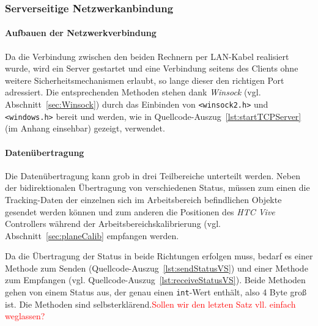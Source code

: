 \subsubsection{Serverseitige Netzwerkanbindung}\label{sec:serverClient}
\paragraph{Aufbauen der Netzwerkverbindung}
Da die Verbindung zwischen den beiden Rechnern per LAN-Kabel realisiert wurde, wird ein Server gestartet und eine Verbindung seitens des Clients ohne weitere Sicherheitsmechanismen erlaubt, so lange dieser den richtigen Port adressiert. Die entsprechenden Methoden stehen dank \textit{Winsock} (vgl. Abschnitt~\ref{sec:Winsock}) durch das Einbinden von \texttt{<winsock2.h>} und \texttt{<windows.h>} bereit und werden, wie in Quellcode-Auszug~\ref{lst:startTCPServer} (im Anhang einsehbar) gezeigt, verwendet. 

\paragraph{Datenübertragung}
Die Datenübertragung kann grob in drei Teilbereiche unterteilt werden. Neben der bidirektionalen Übertragung von verschiedenen Status, müssen zum einen die Tracking-Daten der einzelnen sich im Arbeitsbereich befindlichen Objekte gesendet werden können und zum anderen die Positionen des \emph{HTC Vive} Controllers während der Arbeitsbereichskalibrierung (vgl. Abschnitt~\ref{sec:planeCalib} empfangen werden.

 

Da die Übertragung der Status in beide Richtungen erfolgen muss, bedarf es einer Methode zum Senden (Quellcode-Auszug~\ref{lst:sendStatusVS})  und einer Methode zum Empfangen (vgl. Quellcode-Auszug~\ref{lst:receiveStatusVS}). Beide Methoden gehen von einem Status aus, der genau einen \texttt{int}-Wert enthält, also 4 Byte groß ist. Die Methoden sind selbsterklärend.\textcolor{red}{Sollen wir den letzten Satz vll. einfach weglassen?}



